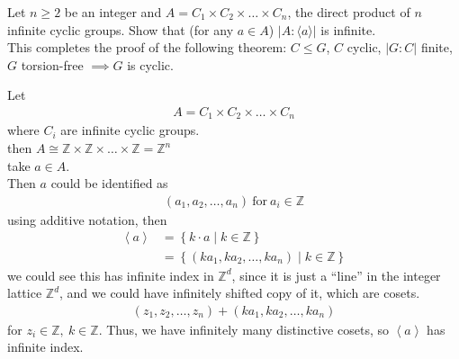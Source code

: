 \documentclass{article}
\begin{document}
\pagebreak

\begin{homeworkProblem}
Let $n \geq 2$ be an integer and $A = C_1 \times C_2 \times \ldots \times C_n$,
the direct product of $n$ infinite cyclic groups.
Show that (for any $a \in A$) $\lvert A : \langle a \rangle \rvert$ is infinite.\\
This completes the proof of the following theorem: $C \leq G$,
$C$ cyclic, $\lvert G: C \rvert$ finite, $G$ torsion-free $\implies G$ is cyclic.\\
\solution

Let 
\begin{align}
    A = C_1 \times C_2 \times \ldots \times C_n
\end{align}
where $C_i$ are infinite cyclic groups.\\
then $A \cong \mathbb{Z} \times \mathbb{Z} \times \ldots \times \mathbb{Z} = \mathbb{Z}^n$\\
take $a \in A$.\\
Then $a$ could be identified as 
\begin{align}
    (a_1, a_2, \ldots, a_n) \ \text{for} \ a_i \in \mathbb{Z}
\end{align}
using additive notation, then
\begin{align}
    \left\langle a \right\rangle &= \left\{ k \cdot a \mid k \in \mathbb{Z} \right\}\\
    &= \left\{ (k a_1, k a_2, \ldots, k a_n ) \mid k \in \mathbb{Z} \right\}
\end{align}
we could see this has infinite index in $\mathbb{Z}^d$, since 
it is just a ``line'' in the integer lattice $\mathbb{Z}^d$,
and we could have infinitely shifted copy of it, 
which are cosets.
\begin{align}
    (z_1, z_2, \ldots, z_n) + (k a_1, k a_2, \ldots, k a_n) 
\end{align}
for $z_i \in \mathbb{Z}, \ k \in \mathbb{Z}$.
Thus, we have infinitely many distinctive cosets, 
so $\left\langle a \right\rangle$ has infinite index.

    
\end{homeworkProblem}

\pagebreak
\end{document}
